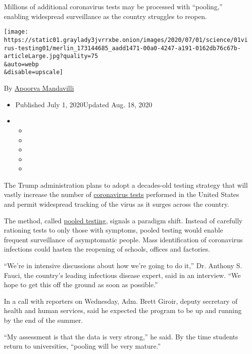Millions of additional coronavirus tests may be processed with
``pooling,'' enabling widespread surveillance as the country struggles
to reopen.

\texttt{[image: https://static01.graylady3jvrrxbe.onion/images/2020/07/01/science/01virus-testing01/merlin\_173144685\_aadd1471-00a0-4247-a191-0162db76c67b-articleLarge.jpg?quality=75\\\&auto=webp\\\&disable=upscale]}

By
\href{https://www.nytimes3xbfgragh.onion/by/apoorva-mandavilli}{Apoorva
Mandavilli}

\begin{itemize}
\item
  Published July 1, 2020Updated Aug. 18, 2020
\item
  \begin{itemize}
  \item
  \item
  \item
  \item
  \item
  \end{itemize}
\end{itemize}

The Trump administration plans to adopt a decades-old testing strategy
that will vastly increase the number of
\href{https://www.nytimes3xbfgragh.onion/2020/08/18/health/coronavirus-pool-te.html}{coronavirus
tests} performed in the United States and permit widespread tracking of
the virus as it surges across the country.

The method, called
\href{https://www.nytimes3xbfgragh.onion/2020/08/18/health/coronavirus-pool-te.html}{pooled
testing}, signals a paradigm shift. Instead of carefully rationing tests
to only those with symptoms, pooled testing would enable frequent
surveillance of asymptomatic people. Mass identification of coronavirus
infections could hasten the reopening of schools, offices and factories.

``We're in intensive discussions about how we're going to do it,'' Dr.
Anthony S. Fauci, the country's leading infectious disease expert, said
in an interview. ``We hope to get this off the ground as soon as
possible.''

In a call with reporters on Wednesday, Adm. Brett Giroir, deputy
secretary of health and human services, said he expected the program to
be up and running by the end of the summer.

``My assessment is that the data is very strong,'' he said. By the time
students return to universities, ``pooling will be very mature.''

